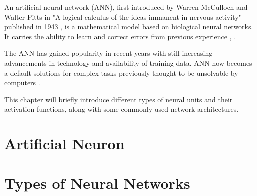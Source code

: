 An artificial neural network (ANN), first introduced by Warren McCulloch and Walter Pitts in "A logical calculus of the ideas immanent in nervous activity" published in 1943 \cite{mcculloch1943logical}, is a mathematical model based on biological neural networks. It 
carries the ability to learn and correct errors from previous experience \cite{designimplentationcc}, \cite{bengio2017deep}.

The ANN has gained popularity in recent years with still increasing advancements in technology and availability of training data. ANN now becomes a default solutions for complex tasks previously thought to be unsolvable by computers \cite{neural2016krishtopa}.

This chapter will briefly introduce different types of neural units and their activation functions, along with some commonly used network architectures.

\section{Artificial Neuron}

\section{Types of Neural Networks}

